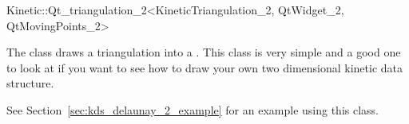 

\begin{ccRefClass}{Kinetic::Qt_triangulation_2<KineticTriangulation_2, QtWidget_2, QtMovingPoints_2>}  %


\ccDefinition
  
The class draws a triangulation into a . This class is
very simple and a good one to look at if you want to see how to draw
your own two dimensional kinetic data structure.

See Section~\ref{sec:kds_delaunay_2_example} for an example using this class. 


\ccCreation
{}  %


\ccSeeAlso


\end{ccRefClass}


